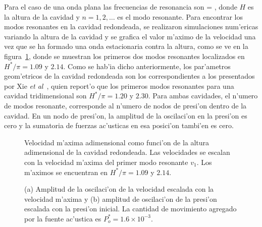 Para el caso de una onda plana las frecuencias de resonancia son
\BE
\omega = ,
\EE
donde $H$ es la altura de la cavidad y $n=1,2,\ldots$ es el modo resonante. Para encontrar los modos resonantes 
en la cavidad redondeada, se realizaron simulaciones num'ericas variando la altura de la cavidad 
y se grafica el valor m'aximo de la velocidad una vez que se ha formado una onda estacionaria 
contra la altura, como se ve en la figura~\ref{fig:resonancia}, donde se muestran los primeros dos  modos resonantes
localizados en $H^\ast/\pi =1.09$ y $2.14$.
Como se hab'ia dicho anteriormente, los par'ametros geom'etricos de la cavidad redondeada son los correspondientes 
a los presentados por Xie {\it et al}~\cite{xie01}, quien report'o que los primeros modos resonantes para 
una cavidad tridimensional son  $H^\ast/\pi=1.20$  y $2.30$. 
Para ambas cavidades, el n'umero de modos resonante, corresponde al n'umero de nodos de presi'on dentro de la 
cavidad. En un nodo de presi'on, la amplitud de la oscilaci'on  en la presi'on es cero y la sumatoria de fuerzas ac'usticas
en esa posici'on tambi'en es cero.

\begin{figure}

\caption{\label{fig:resonancia}
Velocidad m'axima adimensional como funci'on de la altura adimensional de la cavidad redondeada.  Las 
velocidades se escalan con la velocidad m'axima del primer modo resonante $v_1$. Los m'aximos se encuentran
en  $H^\ast/\pi =1.09$ y $2.14$.}
\end{figure}

\begin{figure}
\hskip -3cm

\hskip -3.1cm

\caption{\label{fig:nodos-presion-velocidad}
(a) Amplitud de la oscilaci'on de la velocidad escalada con la velocidad m'axima y (b) amplitud de oscilaci'on 
de la presi'on escalada con la presi'on inicial. La cantidad de movimiento agregado por la fuente ac'ustica es 
$P_o^\ast = 1.6 \times 10^{-3}$.
}
\end{figure}




